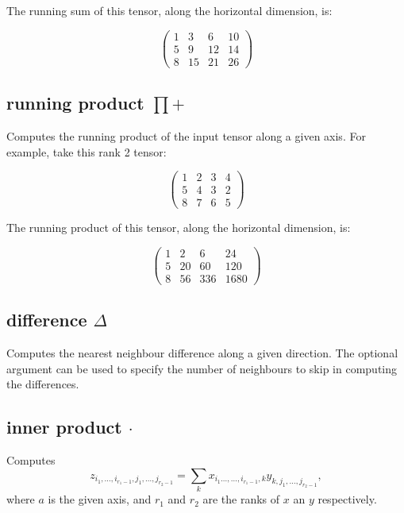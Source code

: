 The running sum of this tensor, along the horizontal dimension, is: 

\begin{displaymath}
  \left(
  \begin{array}{cccc}
    1& 3& 6& 10 \\
    5& 9& 12& 14 \\
    8& 15& 21& 26
  \end{array}
  \right)
\end{displaymath}

\subsection{running product $\prod+$}
\label{Operation:runningProduct} Computes the running
product of the input tensor along a given axis. For example, take
this rank 2 tensor:

\begin{displaymath}
  \left(
  \begin{array}{cccc}
    1& 2& 3& 4\\ 
    5& 4& 3& 2\\ 
    8& 7& 6& 5 
  \end{array}
  \right)
\end{displaymath}

The running product of this tensor, along the horizontal dimension, is: 

\begin{displaymath}
  \left(
  \begin{array}{cccc}
    1& 2& 6& 24\\ 
    5& 20& 60& 120\\ 
    8& 56& 336& 1680 
  \end{array}
  \right)
\end{displaymath}

\subsection{difference $\Delta$}\label{Operation:difference}
Computes the nearest neighbour difference along a given direction. The
optional argument can be used to specify the number of neighbours to
skip in computing the differences.

\subsection{inner product $\cdot$}\label{Operation:innerProduct}
Computes
\begin{displaymath}
z_{i_1,\ldots,i_{r_1-1},j_1,\ldots,j_{r_2-1}} =
\sum_k x_{i_1\ldots,\ldots,i_{r_1-1},k}
y_{k,j_1,\ldots,j_{r_2-1}},
\end{displaymath}
where $a$ is the
given axis, and $r_1$ and $r_2$ are the ranks of $x$ an $y$ respectively.


